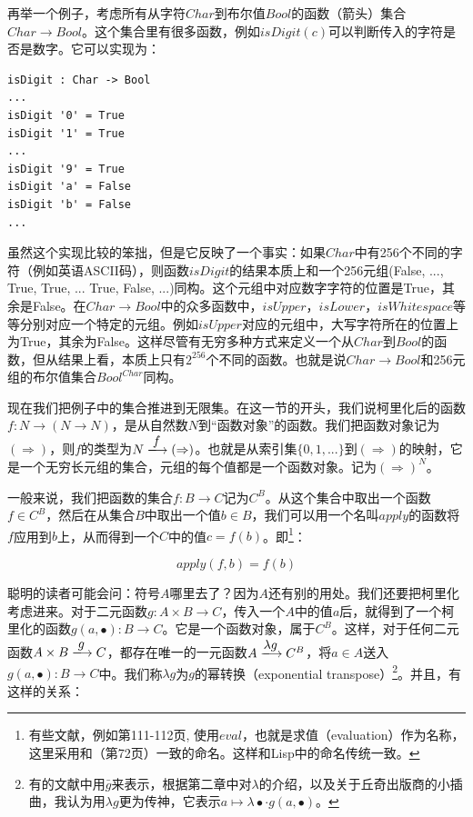 \documentclass[b5paper]{ctexart}
\begin{document}
\begin{example}
再举一个例子，考虑所有从字符$Char$到布尔值$Bool$的函数（箭头）集合$Char \to Bool$。这个集合里有很多函数，例如$isDigit(c)$可以判断传入的字符是否是数字。它可以实现为：

\lstset{frame=none}
\begin{lstlisting}[style=Haskell]
isDigit : Char -> Bool
...
isDigit '0' = True
isDigit '1' = True
...
isDigit '9' = True
isDigit 'a' = False
isDigit 'b' = False
...
\end{lstlisting}

虽然这个实现比较的笨拙，但是它反映了一个事实：如果$Char$中有256个不同的字符（例如英语ASCII码），则函数$isDigit$的结果本质上和一个256元组(False, ..., True, True, ... True, False, ...)同构。这个元组中对应数字字符的位置是True，其余是False。在$Char \to Bool$中的众多函数中，$isUpper$，$isLower$，$isWhitespace$等等分别对应一个特定的元组。例如$isUpper$对应的元组中，大写字符所在的位置上为True，其余为False。这样尽管有无穷多种方式来定义一个从$Char$到$Bool$的函数，但从结果上看，本质上只有$2^{256}$个不同的函数。也就是说$Char \to Bool$和256元组的布尔值集合$Bool^{Char}$同构。
\end{example}

现在我们把例子中的集合推进到无限集。在这一节的开头，我们说柯里化后的函数$f: N \to (N \to N)$，是从自然数$N$到“函数对象”的函数。我们把函数对象记为$(\Rightarrow)$，则$f$的类型为$N \arrowto{f} (\Rightarrow)$。也就是从索引集$\{0, 1, ...\}$到$(\Rightarrow)$的映射，它是一个无穷长元组的集合，元组的每个值都是一个函数对象。记为$(\Rightarrow)^N$。

一般来说，我们把函数的集合$f : B \to C$记为$C^B$。从这个集合中取出一个函数$f \in C^B$，然后在从集合$B$中取出一个值$b \in B$，我们可以用一个名叫$apply$的函数将$f$应用到$b$上，从而得到一个$C$中的值$c = f(b)$。即\footnote{有些文献，例如\cite{PeterSmith2018}第111-112页, \cite{Wiki-Exponentials}使用$eval$，也就是求值（evaluation）作为名称，这里采用和\cite{Bird97}（第72页）一致的命名。这样和Lisp中的命名传统一致。}：

\[
apply(f, b) = f(b)
\]

聪明的读者可能会问：符号$A$哪里去了？因为$A$还有别的用处。我们还要把柯里化考虑进来。对于二元函数$g: A \times B \to C$，传入一个$A$中的值$a$后，就得到了一个柯里化的函数$g(a, \bullet) : B \to C$。它是一个函数对象，属于$C^B$。这样，对于任何二元函数$A \times B \arrowto{g} C$，都存在唯一的一元函数$A \arrowto{\lambda g} C^B$，将$a \in A$送入$g(a, \bullet) : B \to C$中。我们称$\lambda g$为$g$的幂转换（exponential transpose）\footnote{有的文献中用$\bar{g}$来表示，根据第二章中对$\lambda$的介绍，以及关于丘奇出版商的小插曲，我认为用$\lambda g$更为传神，它表示$a \mapsto \lambda \bullet \cdot g(a, \bullet)$。}。并且，有这样的关系：
\end{document}
